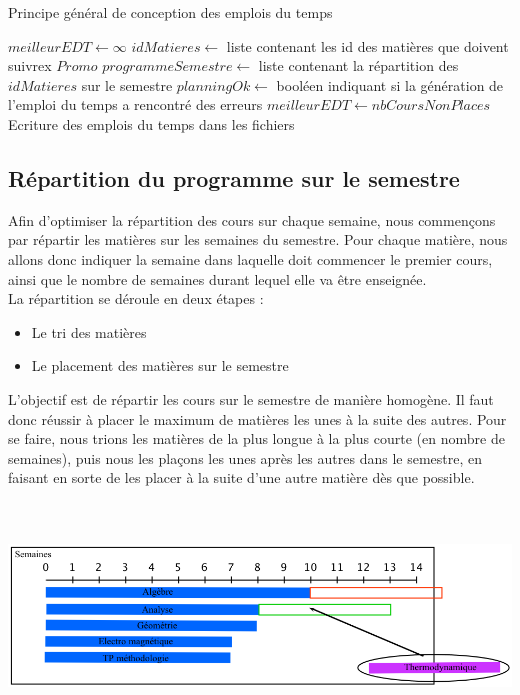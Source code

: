\documentclass[12pt,a4paper,french]{article}
\begin{document}
\begin{algorithm}
\caption{Principe général de conception des emplois du temps}
\begin{algorithmic}
\STATE $meilleurEDT \leftarrow \infty$
\REPEAT
{}
\STATE $idMatieres \leftarrow$ liste contenant les id des matières que doivent suivrex $Promo$
\STATE $programmeSemestre \leftarrow $ liste contenant la répartition des $idMatieres$ sur le semestre
\STATE $planningOk \leftarrow$ booléen indiquant si la génération de l'emploi du temps a rencontré des erreurs
\ENDFOR
{}
\STATE $meilleurEDT \leftarrow nbCoursNonPlaces$
\STATE Ecriture des emplois du temps dans les fichiers
\ENDIF
\ENDIF
{}
\end{algorithmic}
\end{algorithm}

\subsection{Répartition du programme sur le semestre}

Afin d'optimiser la répartition des cours sur chaque semaine, nous commençons par répartir les matières sur les semaines du semestre. Pour chaque matière, nous allons donc indiquer la semaine dans laquelle doit commencer le premier cours, ainsi que le nombre de semaines durant lequel elle va être enseignée.\\

La répartition se déroule en deux étapes : 
\begin{itemize}
\item Le tri des matières 
\item Le placement des matières sur le semestre\\
\end{itemize}

L'objectif est de répartir les cours sur le semestre de manière homogène. Il faut donc réussir à placer le maximum de matières les unes à la suite des autres. Pour se faire, nous trions les matières de la plus longue à la plus courte (en nombre de semaines), puis nous les plaçons les unes après les autres dans le semestre, en faisant en sorte de les placer à la suite d'une autre matière dès que possible.

\begin{center}
\includegraphics [width=160mm, height=60mm]{RepartitionSemestre2.png}
\end{center}
\end{document}
